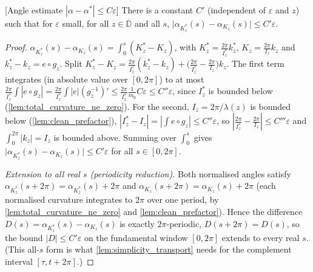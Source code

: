 \begin{lemma}

[Angle estimate $|\alpha-\alpha^*|\le C\varepsilon$]
  \label{lem:angle_dist_le}
  There is a constant $C'$ (independent of $\varepsilon$ and $z$) such that for
  $\varepsilon$ small, for all $z\in\overline{\mathbb{D}}$ and all $s$,
  $\bigl|\alpha_{K^*_z}(s)-\alpha_{K_z}(s)\bigr|\le C'\varepsilon$.
\end{lemma}
\begin{proof}
  $\alpha_{K^*_z}(s)-\alpha_{K_z}(s)=\int_0^s(K^*_z-K_z)$, with
  $K^*_z=\tfrac{2\pi}{I^*_z}k^*_z$, $K_z=\tfrac{2\pi}{I_z}k_z$ and
  $k^*_z-k_z=e\circ g_z$. Split
  $K^*_z-K_z=\tfrac{2\pi}{I^*_z}(k^*_z-k_z)+\bigl(\tfrac{2\pi}{I^*_z}-\tfrac{2\pi}{I_z}\bigr)k_z$.
  The first term integrates (in absolute value over $[0,2\pi]$) to at most
  $\tfrac{2\pi}{I^*_z}\int|e\circ g_z|=\tfrac{2\pi}{I^*_z}\int|e|(g_z^{-1})'
   \le\tfrac{2\pi}{I^*_z}\tfrac1{m_0}C\varepsilon\le C''\varepsilon$, since $I^*_z$ is
  bounded below (\cref{lem:total_curvature_ne_zero}). For the second, $I_z=2\pi/\lambda(z)$
  is bounded below (\cref{lem:clean_prefactor}), $|I^*_z-I_z|=|\int e\circ g_z|\le
  C''\varepsilon$, so $|\tfrac{2\pi}{I^*_z}-\tfrac{2\pi}{I_z}|\le C'''\varepsilon$ and
  $\int_0^{2\pi}|k_z|=I_z$ is bounded above. Summing over $\int_0^s$ gives
  $\bigl|\alpha_{K^*_z}(s)-\alpha_{K_z}(s)\bigr|\le C'\varepsilon$ for all
  $s\in[0,2\pi]$.

  \emph{Extension to all real $s$ (periodicity reduction).} Both normalised angles
  satisfy $\alpha_{K^*_z}(s+2\pi)=\alpha_{K^*_z}(s)+2\pi$ and
  $\alpha_{K_z}(s+2\pi)=\alpha_{K_z}(s)+2\pi$ (each normalised curvature integrates to
  $2\pi$ over one period, by \cref{lem:total_curvature_ne_zero} and
  \cref{lem:clean_prefactor}). Hence the difference
  $D(s)=\alpha_{K^*_z}(s)-\alpha_{K_z}(s)$ is exactly $2\pi$-periodic, $D(s+2\pi)=D(s)$,
  so the bound $|D|\le C'\varepsilon$ on the fundamental window $[0,2\pi]$ extends to
  every real $s$. (This all-$s$ form is what \cref{lem:simplicity_transport} needs for
  the complement interval $[\tau,t+2\pi]$.)
\end{proof}


